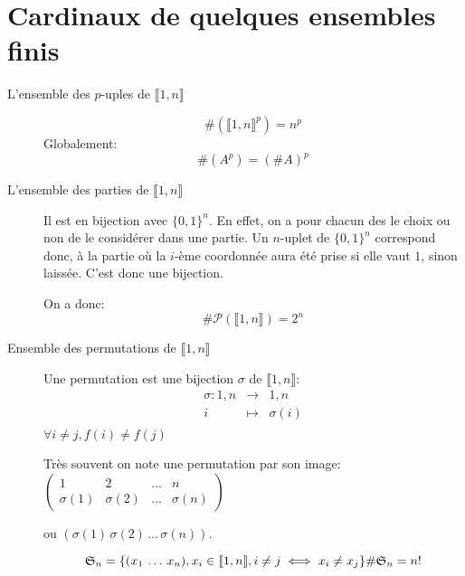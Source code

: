 \section{Cardinaux de quelques ensembles finis}
  \begin{description}
    \item[L'ensemble des $p$-uples de $\llbracket 1,n \rrbracket$]
      \[
        \#(\llbracket 1,n \rrbracket ^p) = n^p
      \]
      Globalement:
      \[
        \#(A^p) = (\#A)^p
      \]

      \item[L'ensemble des parties de $\llbracket 1,n \rrbracket$]
      Il est en bijection avec $\{0,1\}^n$. En effet, on a pour chacun des
      le choix ou non de le considérer dans une partie. Un $n$-uplet
      de $\{0,1\}^n$ correspond donc, à la partie où la $i$-ème coordonnée aura
      été prise si elle vaut $1$, sinon laissée. C'est donc une bijection.


      On a donc: \[
        \#\mathcal{P}(\llbracket 1,n \rrbracket) = 2^n
      \]


      \item[Ensemble des permutations de $\llbracket 1,n \rrbracket$]
      Une permutation est une bijection $\sigma$ de $\llbracket 1,n \rrbracket$:
      \begin{eqnarray*}
        \sigma :  1,n  &\rightarrow&  1,n \\
                             i             &\mapsto& \sigma(i)\\
      \end{eqnarray*}
      $\forall i\neq j, f(i)\neq f(j)$

      Très souvent on note une permutation par son image:
      $
      \begin{pmatrix}
        1 & 2 & \dots & n\\
        \sigma(1) & \sigma(2) & \dots & \sigma(n)
      \end{pmatrix}
      $

      ou $(\sigma(1)\, \sigma(2)\, \dots\, \sigma(n))$.

      \[
        \mathfrak{S}_n = \{(x_1\, \dots\, x_n), x_i\in\llbracket 1,n\rrbracket, i\neq j \iff x_i\neq x_j\}\\
        \#\mathfrak{S}_n = n!
      \]
  \end{description}
